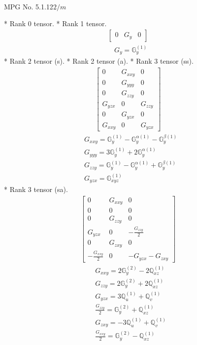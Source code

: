 \documentclass[fleqn,8pt,landscape]{jsarticle}
\begin{document}
\setcounter{MaxMatrixCols}{32}

\renewcommand{\tablename}{Table~}
\renewcommand{\figurename}{Figure~}
\begin{center}
\LARGE
MPG No. 5.1.12\quad$2/m$
\end{center}
* Rank 0 tensor.
* Rank 1 tensor.
\begin{align*}
\begin{bmatrix} 0 & G_{y} & 0 \end{bmatrix}
\end{align*}
\begin{align*}
& G_{y} = \mathbb{G}_{y}^{(1)}
\end{align*}
* Rank 2 tensor (s).
* Rank 2 tensor (a).
* Rank 3 tensor (ss).
\begin{align*}
\begin{bmatrix} 0 & G_{xxy} & 0 \\ 0 & G_{yyy} & 0 \\ 0 & G_{zzy} & 0 \\ G_{yzx} & 0 & G_{zzy} \\ 0 & G_{yzx} & 0 \\ G_{xxy} & 0 & G_{yzx} \end{bmatrix}
\end{align*}
\begin{align*}
& G_{xxy} = \mathbb{G}_{y}^{(1)} - \mathbb{G}_{y}^{\alpha(1)} - \mathbb{G}_{y}^{\beta(1)} \\
& G_{yyy} = 3 \mathbb{G}_{y}^{(1)} + 2 \mathbb{G}_{y}^{\alpha(1)} \\
& G_{zzy} = \mathbb{G}_{y}^{(1)} - \mathbb{G}_{y}^{\alpha(1)} + \mathbb{G}_{y}^{\beta(1)} \\
& G_{yzx} = \mathbb{G}_{xyz}^{(1)}
\end{align*}
* Rank 3 tensor (sa).
\begin{align*}
\begin{bmatrix} 0 & G_{xxy} & 0 \\ 0 & 0 & 0 \\ 0 & G_{zzy} & 0 \\ G_{yzx} & 0 & - \frac{G_{zzy}}{2} \\ 0 & G_{zxy} & 0 \\ - \frac{G_{xxy}}{2} & 0 & - G_{yzx} - G_{zxy} \end{bmatrix}
\end{align*}
\begin{align*}
& G_{xxy} = 2 \mathbb{G}_{y}^{(2)} - 2 \mathbb{Q}_{xz}^{(1)} \\
& G_{zzy} = 2 \mathbb{G}_{y}^{(2)} + 2 \mathbb{Q}_{xz}^{(1)} \\
& G_{yzx} = 3 \mathbb{Q}_{u}^{(1)} + \mathbb{Q}_{v}^{(1)} \\
& \frac{G_{zzy}}{2} = \mathbb{G}_{y}^{(2)} + \mathbb{Q}_{xz}^{(1)} \\
& G_{zxy} = - 3 \mathbb{Q}_{u}^{(1)} + \mathbb{Q}_{v}^{(1)} \\
& \frac{G_{xxy}}{2} = \mathbb{G}_{y}^{(2)} - \mathbb{Q}_{xz}^{(1)}
\end{align*}
\end{document}
